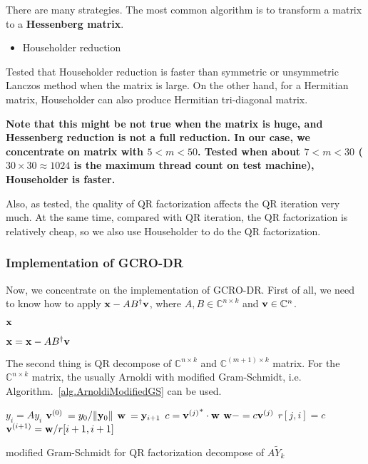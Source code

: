 There are many strategies. The most common algorithm is to transform a matrix to a \textbf{Hessenberg matrix}.

\begin{itemize}
  \item {}Householder reduction
\end{itemize}

Tested that Householder reduction is faster than symmetric or unsymmetric Lanczos method when the matrix is large. On the other hand, for a Hermitian matrix, Householder can also produce Hermitian tri-diagonal matrix.

\textbf{Note that this might be not true when the matrix is huge, and Hessenberg reduction is not a full reduction. In our case, we concentrate on matrix with $5<m<50$. Tested when about $7<m<30$ ($30 \times 30 \approx 1024$ is the maximum thread count on test machine), Householder is faster.}

Also, as tested, the quality of QR factorization affects the QR iteration very much. At the same time, compared with QR iteration, the QR factorization is relatively cheap, so we also use Householder to do the QR factorization.


\subsubsection{\label{sec:implementationgcrodr}Implementation of GCRO-DR}

Now, we concentrate on the implementation of GCRO-DR. First of all, we need to know how to apply ${\bf x}-AB^{\dagger}{\bf v}$, where $A,B\in \mathbb{C}^{n\times k}$ and ${\bf v}\in \mathbb{C}^n$.
\begin{algorithm}[H]
\begin{algorithmic}
\EndFor

\Return $\bf x$
\end{algorithmic}
\caption{${\bf x}={\bf x}-AB^{\dagger}{\bf v}$}
\end{algorithm}

The second thing is QR decompose of $\mathbb{C}^{n\times k}$ and $\mathbb{C}^{(m+1)\times k}$ matrix. For the $\mathbb{C}^{n\times k}$ matrix, the usually Arnoldi with modified Gram-Schmidt, i.e. Algorithm.~\ref{alg.ArnoldiModifiedGS} can be used.
\begin{algorithm}[H]
\begin{algorithmic}
    \State $y_i=Ay_i$
\EndFor
\State ${\bf v}^{(0)}\:=y_0/\|{\bf y}_0\|$
    \State ${\bf w}\:={\bf y}_{i+1}$
        \State $c={{\bf v}^{(j)}}^*\cdot {\bf w}$
        \State ${\bf w}-=c{\bf v}^{(j)}$
        \State $r[j,i]=c$
    \EndFor
    \State ${\bf v}^{(i+1)}={\bf w}/r[i+1,i+1]$
\EndFor

\end{algorithmic}
\caption{modified Gram-Schmidt for QR factorization decompose of $A\tilde{Y}_k$}
\end{algorithm}


